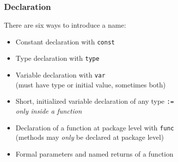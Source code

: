 \documentclass[handout,compress,t,11pt]{beamer}
\begin{document}
\begin{frame}[fragile]
    \frametitle{Declaration}
    There are six ways to introduce a name:
    \begin{itemize}
        \item Constant declaration with \verb|const| \\
        \vspace{0.5\baselineskip}
        \item Type declaration with \verb|type| \\
        \vspace{0.5\baselineskip}
        \item Variable declaration with \verb|var| \\
        (must have type or initial value, sometimes both)
        \vspace{0.5\baselineskip}
        \item Short, initialized variable declaration of any type \verb|:=| \\
         {\em only inside a function} \\
        \vspace{0.5\baselineskip}
        \item Declaration of a function at package level with \verb|func| \\
        (methods may {\em only} be declared at package level)
        \vspace{0.5\baselineskip}
        \item Formal parameters and named returns of a function
    \end{itemize}
\end{frame}
\end{document}
